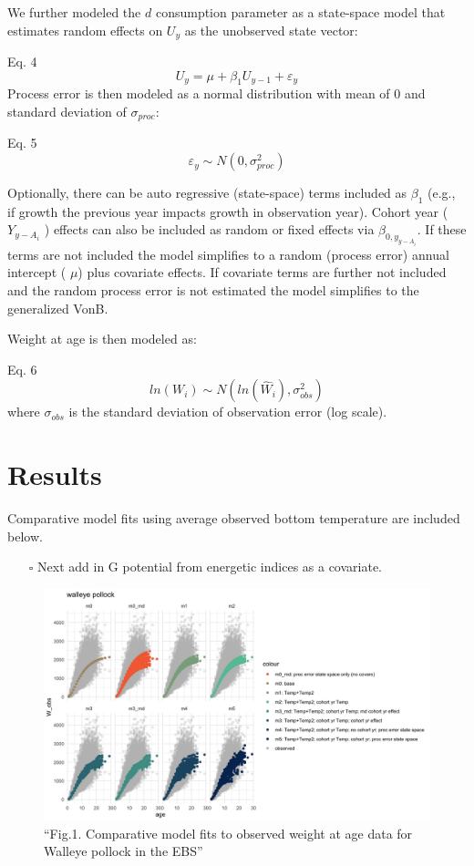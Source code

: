 \documentclass[
]{article}
\providecommand{\tightlist}{%
  \setlength{\itemsep}{0pt}\setlength{\parskip}{0pt}}
\begin{document}
We further modeled the \(d\) consumption parameter as a state-space
model that estimates random effects on \(U_{y}\) as the unobserved state
vector:

Eq. 4 \[ U_{y} = \mu+ \beta_{1}U_{y-1}+\varepsilon_y \] Process error is
then modeled as a normal distribution with mean of 0 and standard
deviation of \(\sigma_{proc}\):

Eq. 5 \[ \varepsilon_{y} \sim N(0,\sigma^2_{proc})\]

Optionally, there can be auto regressive (state-space) terms included as
\(\beta_1\) (e.g., if growth the previous year impacts growth in
observation year). Cohort year (\(Y_{y-A_i}\) ) effects can also be
included as random or fixed effects via \(\beta_{0,y_{y-A_i}}\). If
these terms are not included the model simplifies to a random (process
error) annual intercept ( \(\mu\)) plus covariate effects. If covariate
terms are further not included and the random process error is not
estimated the model simplifies to the generalized VonB.

Weight at age is then modeled as:

Eq. 6 \[ ln({W}_i) \sim N(ln(\hat{W}_i),\sigma^2_{obs})\] where
\(\sigma_{obs}\) is the standard deviation of observation error (log
scale).

\hypertarget{results}{%
\section{Results}\label{results}}

Comparative model fits using average observed bottom temperature are
included below.

\begin{itemize}
\tightlist
\item[$\square$]
  Next add in G potential from energetic indices as a covariate.
\end{itemize}

\begin{figure}
\centering
\includegraphics{Figs/model_plots.jpg}
\caption{``Fig.1. Comparative model fits to observed weight at age data
for Walleye pollock in the EBS''}
\end{figure}
\end{document}
